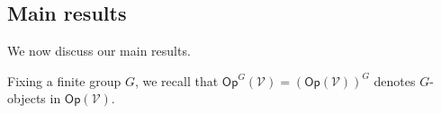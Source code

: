 \documentclass[a4paper,10pt
,draft
]{article}%
\numberwithin{equation}{section}
\numberwithin{figure}{section}
\theoremstyle{definition} %
\newcommand{\set}[1]{\left\{#1\right\}}%
\newcommand{\Sym}{\ensuremath{\mathsf{Sym}}}%
\newcommand{\Top}{\ensuremath{\mathsf{Top}}}
\newcommand{\sSet}{\ensuremath{\mathsf{sSet}}}%
\newcommand{\Op}{\mathsf{Op}}%
\newcommand{\F}{\ensuremath{\mathcal F}}
\newcommand{\V}{\ensuremath{\mathcal V}}
\renewcommand{\O}{\ensuremath{\mathcal O}}
\newcommand{\1}{\ensuremath{\mathbbm 1}}%
\begin{document}




\subsection{Main results}

We now discuss our main results.

Fixing a finite group $G$, we
recall that 
$\mathsf{Op}^G(\mathcal{V})
=
\left(\mathsf{Op}(\mathcal{V})\right)^G$
denotes $G$-objects in 
$\mathsf{Op}(\mathcal{V})$.



\end{document}
